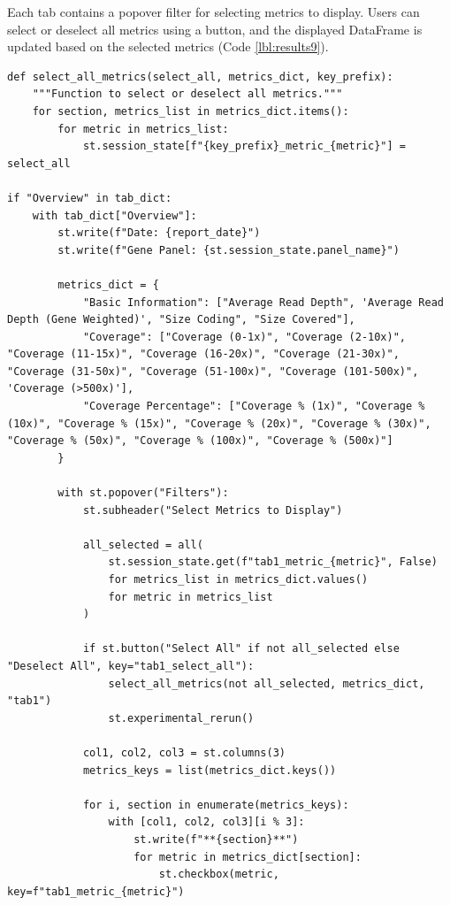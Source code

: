 Each tab contains a popover filter for selecting metrics to display. Users can select or deselect all metrics using a button, and the displayed DataFrame is updated based on the selected metrics (Code \ref{lbl:results9}).

\begin{longlisting}
\begin{verbatim}
def select_all_metrics(select_all, metrics_dict, key_prefix):
    """Function to select or deselect all metrics."""
    for section, metrics_list in metrics_dict.items():
        for metric in metrics_list:
            st.session_state[f"{key_prefix}_metric_{metric}"] = select_all

if "Overview" in tab_dict:
    with tab_dict["Overview"]:
        st.write(f"Date: {report_date}")
        st.write(f"Gene Panel: {st.session_state.panel_name}")

        metrics_dict = {
            "Basic Information": ["Average Read Depth", 'Average Read Depth (Gene Weighted)', "Size Coding", "Size Covered"],
            "Coverage": ["Coverage (0-1x)", "Coverage (2-10x)", "Coverage (11-15x)", "Coverage (16-20x)", "Coverage (21-30x)", "Coverage (31-50x)", "Coverage (51-100x)", "Coverage (101-500x)", 'Coverage (>500x)'],
            "Coverage Percentage": ["Coverage % (1x)", "Coverage % (10x)", "Coverage % (15x)", "Coverage % (20x)", "Coverage % (30x)", "Coverage % (50x)", "Coverage % (100x)", "Coverage % (500x)"]
        }

        with st.popover("Filters"):
            st.subheader("Select Metrics to Display")

            all_selected = all(
                st.session_state.get(f"tab1_metric_{metric}", False)
                for metrics_list in metrics_dict.values()
                for metric in metrics_list
            )

            if st.button("Select All" if not all_selected else "Deselect All", key="tab1_select_all"):
                select_all_metrics(not all_selected, metrics_dict, "tab1")
                st.experimental_rerun()

            col1, col2, col3 = st.columns(3)
            metrics_keys = list(metrics_dict.keys())

            for i, section in enumerate(metrics_keys):
                with [col1, col2, col3][i % 3]:
                    st.write(f"**{section}**")
                    for metric in metrics_dict[section]:
                        st.checkbox(metric, key=f"tab1_metric_{metric}")


\end{verbatim}
\end{longlisting}
